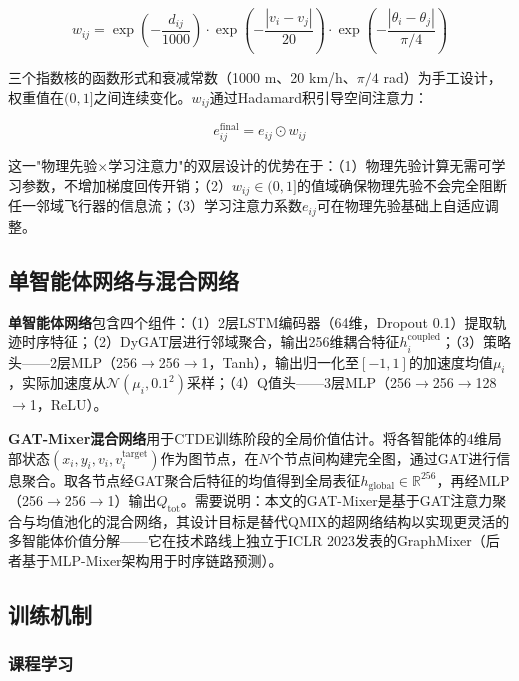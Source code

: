 \documentclass[12pt,a4paper,UTF8]{ctexart}
\begin{document}
\begin{equation}
    w_{ij} = \exp\!\left(-\frac{d_{ij}}{1000}\right) \cdot \exp\!\left(-\frac{|v_i - v_j|}{20}\right) \cdot \exp\!\left(-\frac{|\theta_i - \theta_j|}{\pi/4}\right)
\end{equation}

三个指数核的函数形式和衰减常数（1000 m、20 km/h、$\pi/4$ rad）为手工设计，权重值在$(0, 1]$之间连续变化。$w_{ij}$通过Hadamard积引导空间注意力：

\begin{equation}
    e_{ij}^{\text{final}} = e_{ij} \odot w_{ij}
\end{equation}

这一"物理先验$\times$学习注意力"的双层设计的优势在于：（1）物理先验计算无需可学习参数，不增加梯度回传开销；（2）$w_{ij} \in (0, 1]$的值域确保物理先验不会完全阻断任一邻域飞行器的信息流；（3）学习注意力系数$e_{ij}$可在物理先验基础上自适应调整。

\subsection{单智能体网络与混合网络}

\textbf{单智能体网络}包含四个组件：（1）2层LSTM编码器（64维，Dropout 0.1）提取轨迹时序特征；（2）DyGAT层进行邻域聚合，输出256维耦合特征$h_i^{\text{coupled}}$；（3）策略头——2层MLP（256$\to$256$\to$1，Tanh），输出归一化至$[-1,1]$的加速度均值$\mu_i$，实际加速度从$\mathcal{N}(\mu_i, 0.1^2)$采样；（4）Q值头——3层MLP（256$\to$256$\to$128$\to$1，ReLU）。

\textbf{GAT-Mixer混合网络}用于CTDE训练阶段的全局价值估计。将各智能体的4维局部状态$(x_i, y_i, v_i, v_i^{\text{target}})$作为图节点，在$N$个节点间构建完全图，通过GAT进行信息聚合。取各节点经GAT聚合后特征的均值得到全局表征$h_{\text{global}} \in \mathbb{R}^{256}$，再经MLP（256$\to$256$\to$1）输出$Q_{\text{tot}}$。需要说明：本文的GAT-Mixer是基于GAT注意力聚合与均值池化的混合网络，其设计目标是替代QMIX的超网络结构以实现更灵活的多智能体价值分解——它在技术路线上独立于ICLR 2023发表的GraphMixer\cite{ref28}（后者基于MLP-Mixer架构用于时序链路预测）。

\subsection{训练机制}

\subsubsection{课程学习}
\end{document}
